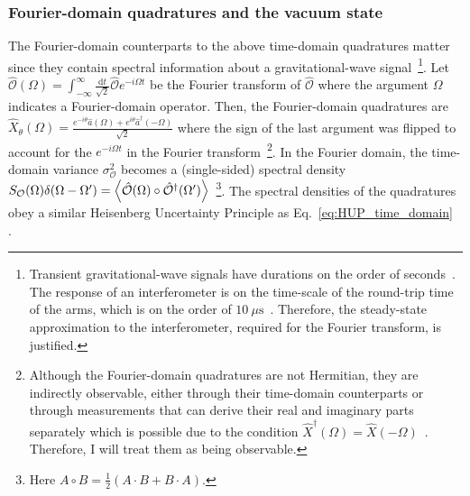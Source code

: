 
\subsubsection{Fourier-domain quadratures and the vacuum state}

The Fourier-domain counterparts to the above time-domain quadratures matter since they contain spectral information about a gravitational-wave signal~\footnote{Transient gravitational-wave signals have durations on the order of seconds~\cite{}. The response of an interferometer is on the time-scale of the round-trip time of the arms, which is on the order of $10~\mu\text{s}$~\cite{}. Therefore, the steady-state approximation to the interferometer, required for the Fourier transform, is justified.}. %
Let $\hat{\mathcal{O}}(\Omega) = \int_{-\infty}^\infty \frac{\mathrm{d}t}{\sqrt{2}} \hat{\mathcal{O}} e^{-i\Omega t}$ be the Fourier transform of $\hat{\mathcal{O}}$ where the argument $\Omega$ indicates a Fourier-domain operator. Then, the Fourier-domain quadratures are $\hat{X}_\theta(\Omega)=\frac{e^{-i \theta}\hat{a}(\Omega)+e^{i \theta}\hat{a}^\dag(-\Omega)}{\sqrt{2}}$ where the sign of the last argument was flipped to account for the $e^{-i\Omega t}$ in the Fourier transform~\footnote{Although the Fourier-domain quadratures are not Hermitian, they are indirectly observable, either through their time-domain counterparts or through measurements that can derive their real and imaginary parts separately which is possible due to the condition $\hat{X}^\dag(\Omega)=\hat{X}(-\Omega)$~\cite{SCHUMAKER1986317}. Therefore, I will treat them as being observable.}.
In the Fourier domain, the time-domain variance $\sigma_\mathcal{O}^2$ becomes a (single-sided) spectral density $S_\mathcal{O}(\Omega)\delta(\Omega-\Omega')=\ev{\hat{\mathcal{O}}(\Omega)\circ\hat{\mathcal{O}}^\dag(\Omega')}$~\footnote{Here $A\circ B=\frac{1}{2}(A\cdot B+B\cdot A)$.}.
The spectral densities of the quadratures obey a similar Heisenberg Uncertainty Principle as Eq.~\ref{eq:HUP_time_domain}~\cite{} . 
